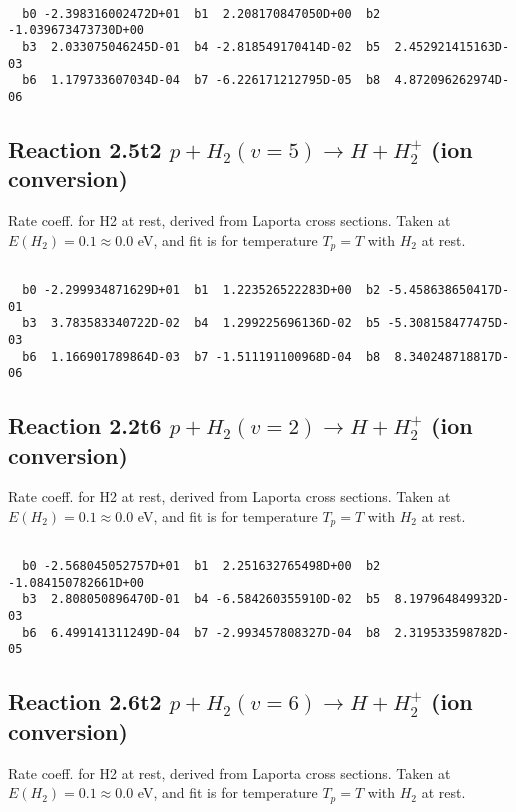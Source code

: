 \begin{small}\begin{verbatim}

  b0 -2.398316002472D+01  b1  2.208170847050D+00  b2 -1.039673473730D+00
  b3  2.033075046245D-01  b4 -2.818549170414D-02  b5  2.452921415163D-03
  b6  1.179733607034D-04  b7 -6.226171212795D-05  b8  4.872096262974D-06

\end{verbatim}\end{small}

\newpage
\subsection{
Reaction 2.5t2
$ p + H_2(v=5) \rightarrow H + H_2^+$ (ion conversion)
}
Rate coeff. for H2 at rest, derived from Laporta cross sections.
Taken at $E(H_2) = 0.1 \approx 0.0$ eV,  and fit is for temperature $T_p=T$ with $H_2$ at rest.

\begin{small}\begin{verbatim}

  b0 -2.299934871629D+01  b1  1.223526522283D+00  b2 -5.458638650417D-01
  b3  3.783583340722D-02  b4  1.299225696136D-02  b5 -5.308158477475D-03
  b6  1.166901789864D-03  b7 -1.511191100968D-04  b8  8.340248718817D-06

\end{verbatim}\end{small}

\newpage
\subsection{
Reaction 2.2t6
$ p + H_2(v=2) \rightarrow H + H_2^+$ (ion conversion)
}
Rate coeff. for H2 at rest, derived from Laporta cross sections.
Taken at $E(H_2) = 0.1 \approx 0.0$ eV,  and fit is for temperature $T_p=T$ with $H_2$ at rest.

\begin{small}\begin{verbatim}

  b0 -2.568045052757D+01  b1  2.251632765498D+00  b2 -1.084150782661D+00
  b3  2.808050896470D-01  b4 -6.584260355910D-02  b5  8.197964849932D-03
  b6  6.499141311249D-04  b7 -2.993457808327D-04  b8  2.319533598782D-05

\end{verbatim}\end{small}

\newpage
\subsection{
Reaction 2.6t2
$ p + H_2(v=6) \rightarrow H + H_2^+$ (ion conversion)
}
Rate coeff. for H2 at rest, derived from Laporta cross sections.
Taken at $E(H_2) = 0.1 \approx 0.0$ eV,  and fit is for temperature $T_p=T$ with $H_2$ at rest.

